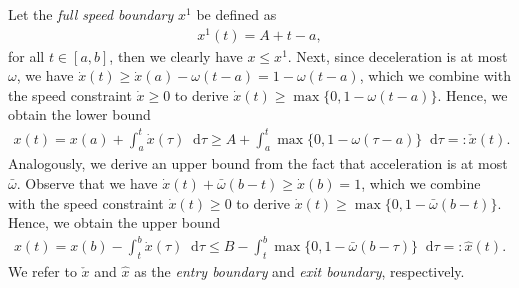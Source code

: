 \documentclass[a4paper]{article}
\theoremstyle{definition}
\theoremstyle{plain}
\newcommand*\diff{\mathop{}\!\mathrm{d}}
\begin{document}
Let the \emph{full speed boundary} $x^{1}$ be defined as
\begin{align}
  x^{1}(t) = A + t - a,
\end{align}
for all $t \in [a, b]$, then we clearly have $x \leq x^{1}$.
%
Next, since deceleration is at most $\omega$, we have
$\dot{x}(t) \geq \dot{x}(a) - \omega(t - a) = 1 - \omega(t - a)$, which we
combine with the speed constraint $\dot{x} \geq 0$ to derive
$\dot{x}(t) \geq \max\{0, 1 - \omega (t - a) \}$. Hence, we obtain the lower
bound
\begin{align}\label{eq:check-x}
  x(t) = x(a) + \int_{a}^{t} \dot{x}(\tau) \diff \tau \geq A + \int_{a}^{t} \max\{0, 1 - \omega (\tau - a) \} \diff \tau =: \check{x}(t) .
\end{align}
%
Analogously, we derive an upper bound from the fact that acceleration is at most $\bar{\omega}$. Observe that we have
$\dot{x}(t) + \bar{\omega} (b - t) \geq \dot{x}(b) = 1$, which we combine
with the speed constraint $\dot{x}(t) \geq 0$ to derive
$\dot{x}(t) \geq \max \{ 0, 1 - \bar{\omega}(b - t) \}$. Hence, we obtain the
upper bound
\begin{align}\label{eq:hat-x}
  x(t) = x(b) - \int_{t}^{b} \dot{x}(\tau) \diff \tau
  \leq B - \int_{t}^{b} \max\{ 0, 1 -\bar{\omega} (b - \tau) \} \diff \tau =: \hat{x}(t) .
\end{align}
%
We refer to $\check{x}$ and $\hat{x}$ as the \emph{entry boundary} and
\emph{exit boundary}, respectively.
\end{document}
